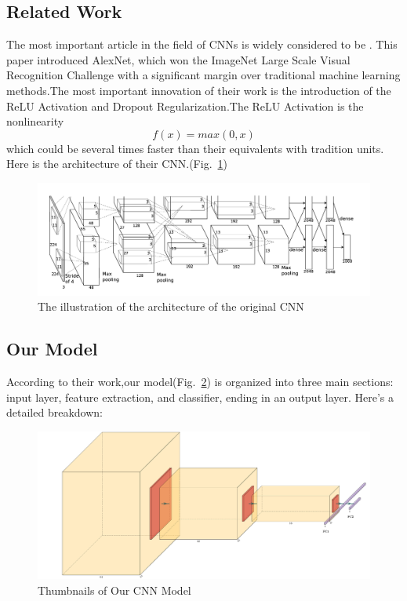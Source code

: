 \documentclass{mcmthesis}
\begin{document}
\subsection{Related Work}
The most important article in the field of CNNs is widely considered to be \cite{krizhevsky2012imagenet}. This paper introduced AlexNet, which won the ImageNet Large Scale Visual Recognition Challenge with a significant margin over traditional machine learning methods.The most important innovation of their work is the introduction of the ReLU Activation and Dropout Regularization.The ReLU Activation is the nonlinearity 
\begin{equation}
    f(x) = max(0,x)
\end{equation}
which could be several times faster than their equivalents with tradition units. Here is the architecture of their CNN.(Fig.~\ref{fig:Traditional_Architecture_of_CNN})

\begin{figure}[htbp]
\centering
\includegraphics[width = \textwidth]{pics/Traditional_Architecture_of_CNN.png}
\caption{The illustration of the architecture of the original CNN}
\label{fig:Traditional_Architecture_of_CNN}
\end{figure}

\subsection{Our Model}
According to their work,our model(Fig.~\ref{fig:Thumbnails_of_Our_CNN_model}) is organized into three main sections: input layer, feature extraction, and classifier, ending in an output layer. Here’s a detailed breakdown:

\begin{figure}[htbp]
\centering
\includegraphics[width =\textwidth]{pics/Thumbnails_of_Our_CNN_model.png}
\caption{Thumbnails of Our CNN Model}
\label{fig:Thumbnails_of_Our_CNN_model}
\end{figure}
\end{document}
